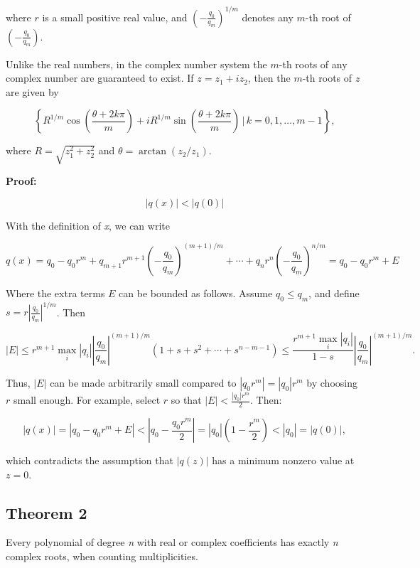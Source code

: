 where \(r\) is a small positive real value, and \({\left(-\frac{q_0}{q_m}\right)}^{1/m}\) denotes any 
\(m\)-th root of \(\left(-\frac{q_0}{q_m}\right)\).
\vspace{\baselineskip}

Unlike the real numbers, in the complex number system the \(m\)-th roots of any complex number are 
guaranteed to exist. If \(z = z_1 + i z_2\), then the \(m\)-th roots of \emph{z} are given by

\[
	\left\{ R^{1/m} \cos\left(\frac{\theta + 2k\pi}{m}\right) + i R^{1/m} \sin\left(\frac{\theta + 
	2k\pi}{m}\right) \,\bigg|\, k = 0, 1, \ldots, m-1 \right\},
\]

where \(R = \sqrt{z_1^2 + z_2^2}\) and \(\theta = \arctan(z_2 / z_1)\).
\vspace{\baselineskip}

\textbf{Proof:} 

\[|q(x)| < |q(0)|\]

With the definition of \emph{x}, we can write

\[
	q(x) = q_0 - q_0 r^m + q_{m+1} r^{m+1} {\left(-\frac{q_0}{q_m}\right)}^{(m+1)/m} + \cdots + q_n r^n 
	{\left(-\frac{q_0}{q_m}\right)}^{n/m} = q_0 - q_0 r^m + E
\]

Where the extra terms \(E\) can be bounded as follows. Assume \(q_0 \leq q_m\), and define 
\(s = r \left|\frac{q_0}{q_m}\right|^{1/m}\). Then

\[
	|E| \leq r^{m+1} \max_i |q_i| \left|\frac{q_0}{q_m}\right|^{(m+1)/m} (1 + s + s^2 + 
	\cdots + s^{n - m - 1}) \leq \frac{r^{m+1} \max_i |q_i|}{1 - s} \left|\frac{q_0}{q_m}\right|^{(m+1)/m}.
\]

Thus, \(|E|\) can be made arbitrarily small compared to \(|q_0 r^m| = |q_0| r^m\) by choosing \(r\) 
small enough. For example, select \(r\) so that \(|E| < \frac{|q_0| r^m}{2}\). Then:

\[
	|q(x)| = |q_0 - q_0 r^m + E| < |q_0 - \frac{q_0 r^m}{2}| = |q_0| \left(1 - \frac{r^m}{2}\right) < 
	|q_0| = |q(0)|,
\]

which contradicts the assumption that \(|q(z)|\) has a minimum nonzero value at \(z = 0\).
\QED

\subsection{Theorem 2}

Every polynomial of degree \emph{n} with real or complex coefficients has exactly \emph{n} complex roots, 
when counting multiplicities.
\vspace{\baselineskip}

